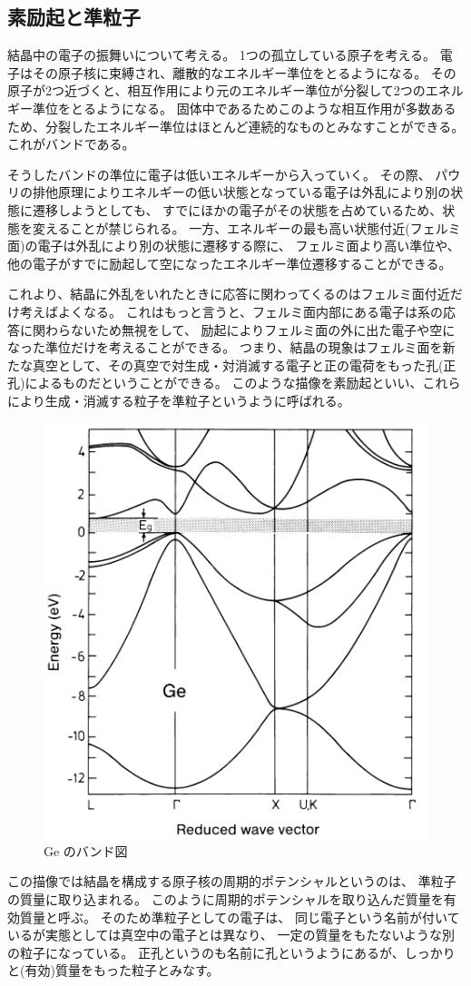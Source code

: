 \documentclass[11pt,dvipdfmx,a4paper]{jsarticle}
\numberwithin{equation}{section}
\begin{document}
\subsection{素励起と準粒子}
結晶中の電子の振舞いについて考える。
1つの孤立している原子を考える。
電子はその原子核に束縛され、離散的なエネルギー準位をとるようになる。
その原子が2つ近づくと、相互作用により元のエネルギー準位が分裂して2つのエネルギー準位をとるようになる。
固体中であるためこのような相互作用が多数あるため、分裂したエネルギー準位はほとんど連続的なものとみなすことができる。
これがバンドである。

そうしたバンドの準位に電子は低いエネルギーから入っていく。
その際、
パウリの排他原理によりエネルギーの低い状態となっている電子は外乱により別の状態に遷移しようとしても、
すでにほかの電子がその状態を占めているため、状態を変えることが禁じられる。
一方、エネルギーの最も高い状態付近(フェルミ面)の電子は外乱により別の状態に遷移する際に、
フェルミ面より高い準位や、他の電子がすでに励起して空になったエネルギー準位遷移することができる。

これより、結晶に外乱をいれたときに応答に関わってくるのはフェルミ面付近だけ考えばよくなる。
これはもっと言うと、フェルミ面内部にある電子は系の応答に関わらないため無視をして、
励起によりフェルミ面の外に出た電子や空になった準位だけを考えることができる。
つまり、結晶の現象はフェルミ面を新たな真空として、その真空で対生成・対消滅する電子と正の電荷をもった孔(正孔)によるものだということができる。
このような描像を素励起といい、これらにより生成・消滅する粒子を準粒子というように呼ばれる。

\begin{figure}
	\centering
	\includegraphics[width=0.4\columnwidth]{graph/graph01.png}
	\caption{Ge のバンド図\cite{ibach-luth}}
	\label{graph:01}
\end{figure}
この描像では結晶を構成する原子核の周期的ポテンシャルというのは、
準粒子の質量に取り込まれる。
このように周期的ポテンシャルを取り込んだ質量を有効質量と呼ぶ。
そのため準粒子としての電子は、
同じ電子という名前が付いているが実態としては真空中の電子とは異なり、
一定の質量をもたないような別の粒子になっている。
正孔というのも名前に孔というようにあるが、しっかりと(有効)質量をもった粒子とみなす。
\end{document}

